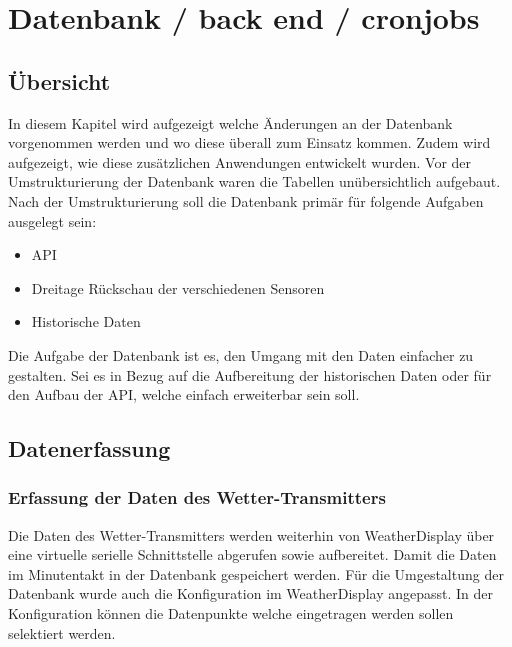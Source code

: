 \section{Datenbank / back end / cronjobs}

\subsection{Übersicht}

In diesem Kapitel wird aufgezeigt welche Änderungen an der Datenbank vorgenommen werden und wo diese überall zum Einsatz kommen. Zudem wird aufgezeigt, wie diese zusätzlichen Anwendungen entwickelt wurden. Vor der Umstrukturierung der Datenbank waren die Tabellen unübersichtlich aufgebaut. Nach der Umstrukturierung soll die Datenbank primär für folgende Aufgaben ausgelegt sein:\\
\begin{itemize}
\item API
\item Dreitage Rückschau der verschiedenen Sensoren
\item Historische Daten
\end{itemize}

Die Aufgabe der Datenbank ist es, den Umgang mit den Daten einfacher zu gestalten. Sei es in Bezug auf die Aufbereitung der historischen Daten oder für den Aufbau der API, welche einfach erweiterbar sein soll.



\subsection{Datenerfassung}
\subsubsection{Erfassung der Daten des Wetter-Transmitters}
Die Daten des Wetter-Transmitters werden weiterhin von WeatherDisplay über eine virtuelle serielle Schnittstelle abgerufen sowie aufbereitet. Damit die Daten im Minutentakt in der Datenbank gespeichert werden. Für die Umgestaltung der Datenbank wurde auch die Konfiguration im WeatherDisplay angepasst.  In der Konfiguration können die Datenpunkte welche eingetragen werden sollen selektiert werden. 

